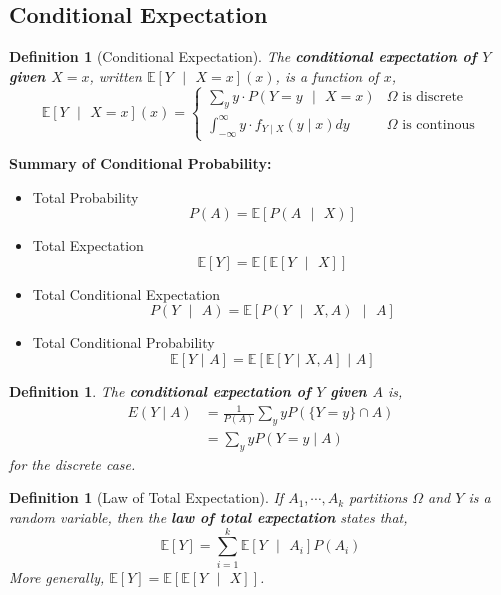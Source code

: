 \documentclass{tufte-handout}
\newtheorem{defn}[thm]{Definition}
\begin{document}
\subsection{Conditional Expectation}
\begin{defn}[Conditional Expectation]
  The \textbf{conditional expectation of $Y$ given $X = x$}, written $\mathbb{E}[Y \text{ $|$ } X = x](x)$, is a function of $x$,
  \[
  \mathbb{E}[Y \text{ $|$ } X = x](x) = \begin{cases}
    \sum_{y} y \cdot P(Y = y \text{ $|$ } X = x) & \text{$\Omega$ is discrete} \\
    \int_{-\infty}^{\infty} y \cdot f_{Y \mid X}(y \mid x) d y & \text{$\Omega$ is continous}
  \end{cases} 
  \]
\end{defn}

\begin{marginfigure}
  \textbf{Summary of Conditional Probability:}
  \begin{itemize}
      \item Total Probability
      \[P(A) = \mathbb{E}[P(A \text{ $|$ } X)]\]
      \item Total Expectation
      \[\mathbb{E}[Y] = \mathbb{E}[\mathbb{E}[Y \text{ $|$ } X]]\]
      \item Total Conditional Expectation
      \[P(Y \text{ $|$ } A) = \mathbb{E}[P(Y \text{ $|$ } X, A) \text{ $|$ } A]\]
      \item Total Conditional Probability
      \[\mathbb{E}[Y \text{ | } A] = \mathbb{E}[\mathbb{E}[Y \text{ | } X,A] \text{ | } A]\]
  \end{itemize}
\end{marginfigure}

\begin{defn}
  The \textbf{conditional expectation of $Y$ given $A$} is,
  \begin{align*}
    E(Y \mid A)&=\frac{1}{P(A)} \sum_{y} y P(\{Y=y\} \cap A) \\
               &=\sum_{y} y P(Y=y \mid A)
  \end{align*}
  \noindent for the discrete case.
\end{defn}

\begin{defn}[Law of Total Expectation]
  If $A_1, \cdots, A_k$ partitions $\Omega$ and $Y$ is a random variable, then the \textbf{law of total expectation} states that,
  \[\mathbb{E}[Y] = \sum_{i=1}^k \mathbb{E}[Y \text{ $|$ } A_i] P(A_i)\]
  \noindent More generally, $\mathbb{E}[Y] = \mathbb{E}[\mathbb{E}[Y \text{ $|$ } X]]$.
\end{defn}
\end{document}
